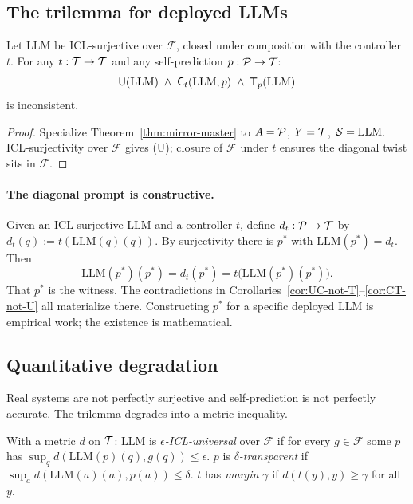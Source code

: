 \subsection{The trilemma for deployed LLMs}
\label{sec:llm-direct}

\begin{corollary}
\label{cor:llm-trilemma}
Let $\mathrm{LLM}$ be ICL-surjective over $\mathcal{F}$, closed under composition with the controller $t$. For any $t : \mathcal{T} \to \mathcal{T}$ and any self-prediction $p : \mathcal{P} \to \mathcal{T}$:
\[
   \mathsf{U}(\mathrm{LLM}) \;\wedge\; \mathsf{C}_t(\mathrm{LLM}, p) \;\wedge\; \mathsf{T}_p(\mathrm{LLM})
\]
is inconsistent.
\end{corollary}

\begin{proof}
Specialize Theorem~\ref{thm:mirror-master} to $A = \mathcal{P}$, $Y = \mathcal{T}$, $\mathcal{S} = \mathrm{LLM}$. ICL-surjectivity over $\mathcal{F}$ gives (U); closure of $\mathcal{F}$ under $t$ ensures the diagonal twist sits in $\mathcal{F}$.
\end{proof}

\paragraph{The diagonal prompt is constructive.}
Given an ICL-surjective LLM and a controller $t$, define $d_t : \mathcal{P} \to \mathcal{T}$ by $d_t(q) := t(\mathrm{LLM}(q)(q))$. By surjectivity there is $p^*$ with $\mathrm{LLM}(p^*) = d_t$. Then
\[
   \mathrm{LLM}(p^*)(p^*) = d_t(p^*) = t\bigl(\mathrm{LLM}(p^*)(p^*)\bigr).
\]
That $p^*$ is the witness. The contradictions in Corollaries~\ref{cor:UC-not-T}--\ref{cor:CT-not-U} all materialize there. Constructing $p^*$ for a specific deployed LLM is empirical work; the existence is mathematical.

\subsection{Quantitative degradation}
\label{sec:quantitative}

Real systems are not perfectly surjective and self-prediction is not perfectly accurate. The trilemma degrades into a metric inequality.

\begin{definition}
\label{def:approx}
With a metric $d$ on $\mathcal{T}$:
$\mathrm{LLM}$ is \emph{$\epsilon$-ICL-universal} over $\mathcal{F}$ if for every $g \in \mathcal{F}$ some $p$ has $\sup_q d(\mathrm{LLM}(p)(q), g(q)) \le \epsilon$.
$p$ is \emph{$\delta$-transparent} if $\sup_a d(\mathrm{LLM}(a)(a), p(a)) \le \delta$.
$t$ has \emph{margin $\gamma$} if $d(t(y), y) \ge \gamma$ for all $y$.
\end{definition}

